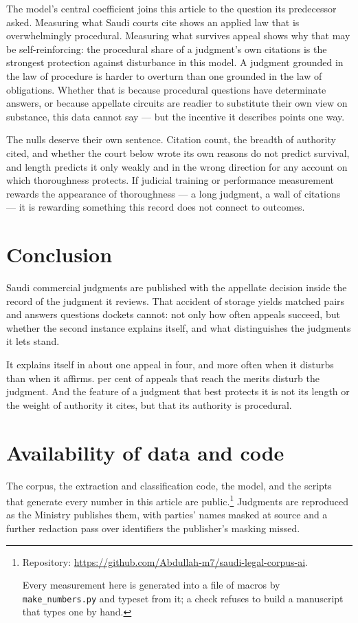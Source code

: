 \documentclass[11pt]{article}
\newif\ifanon
\begin{document}
The model's central coefficient joins this article to the question its
predecessor asked. Measuring what Saudi courts cite shows an applied law that
is overwhelmingly procedural. Measuring what survives appeal shows why that
may be self-reinforcing: the procedural share of a judgment's own citations
is the strongest protection against disturbance in this model. A judgment
grounded in the law of procedure is harder to overturn than one grounded in
the law of obligations. Whether that is because procedural questions have
determinate answers, or because appellate circuits are readier to substitute
their own view on substance, this data cannot say --- but the incentive it
describes points one way.

The nulls deserve their own sentence. Citation count, the breadth of
authority cited, and whether the court below wrote its own reasons do not
predict survival, and length predicts it only weakly and in the wrong
direction for any account on which thoroughness protects. If judicial training
or performance measurement rewards the appearance of thoroughness --- a long
judgment, a wall of citations --- it is rewarding something this record does
not connect to outcomes.

\section{Conclusion}

Saudi commercial judgments are published with the appellate decision inside
the record of the judgment it reviews. That accident of storage yields
\nPaired{} matched pairs and answers questions dockets cannot: not only how
often appeals succeed, but whether the second instance explains itself, and
what distinguishes the judgments it lets stand.

It explains itself in about one appeal in four, and more often when it
disturbs than when it affirms. \nDisturbedShare{} per cent of appeals that
reach the merits disturb the judgment. And the feature of a judgment that
best protects it is not its length or the weight of authority it cites, but
that its authority is procedural.

\section*{Availability of data and code}

The corpus, the extraction and classification code, the model, and the
scripts that generate every number in this article are public.\footnote{%
\ifanon
Repository withheld for anonymous review: its address names the author. It
holds the corpus, the analysis code and the replication guide, and will be
cited in full in the accepted version.
\else
Repository: \url{https://github.com/Abdullah-m7/saudi-legal-corpus-ai}.
\fi
Every measurement here is generated into a file of macros by
\texttt{make\_numbers.py} and typeset from it; a check refuses to build a
manuscript that types one by hand.} Judgments are reproduced as the Ministry
publishes them, with parties' names masked at source and a further redaction
pass over identifiers the publisher's masking missed.
\end{document}
